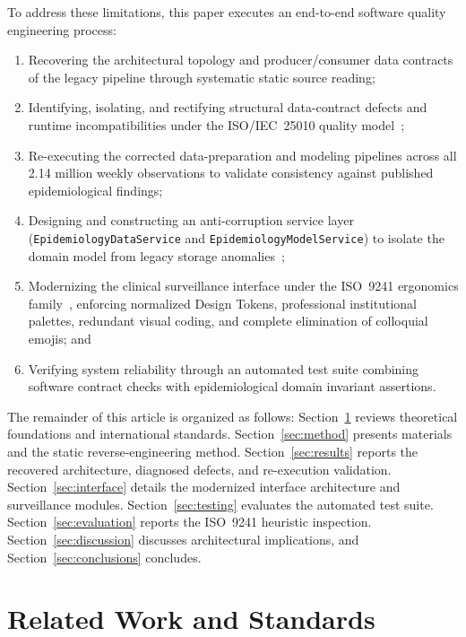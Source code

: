 \documentclass[conference]{IEEEtran}
\begin{document}
To address these limitations, this paper executes an end-to-end software quality engineering process:
\begin{enumerate}
  \item Recovering the architectural topology and producer/consumer data contracts of the legacy pipeline through systematic static source reading;
  \item Identifying, isolating, and rectifying structural data-contract defects and runtime incompatibilities under the ISO/IEC~25010 quality model~\cite{ISO25010};
  \item Re-executing the corrected data-preparation and modeling pipelines across all 2.14 million weekly observations to validate consistency against published epidemiological findings;
  \item Designing and constructing an anti-corruption service layer (\texttt{EpidemiologyDataService} and \texttt{EpidemiologyModelService}) to isolate the domain model from legacy storage anomalies~\cite{Evans2003};
  \item Modernizing the clinical surveillance interface under the ISO~9241 ergonomics family~\cite{ISO9241-11, ISO9241-210, ISO9241-110, ISO9241-12}, enforcing normalized Design Tokens, professional institutional palettes, redundant visual coding, and complete elimination of colloquial emojis; and
  \item Verifying system reliability through an automated test suite combining software contract checks with epidemiological domain invariant assertions.
\end{enumerate}

The remainder of this article is organized as follows: Section~\ref{sec:related} reviews theoretical foundations and international standards. Section~\ref{sec:method} presents materials and the static reverse-engineering method. Section~\ref{sec:results} reports the recovered architecture, diagnosed defects, and re-execution validation. Section~\ref{sec:interface} details the modernized interface architecture and surveillance modules. Section~\ref{sec:testing} evaluates the automated test suite. Section~\ref{sec:evaluation} reports the ISO~9241 heuristic inspection. Section~\ref{sec:discussion} discusses architectural implications, and Section~\ref{sec:conclusions} concludes.

\section{Related Work and Standards}
\label{sec:related}
\end{document}
